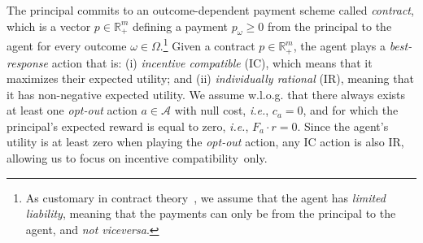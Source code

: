 The principal commits to an outcome-dependent payment scheme called \emph{contract}, which is a vector $p \in \mathbb{R}^{m}_{+}$ defining a payment $p_\omega \geq 0$ from the principal to the agent for every outcome $\omega \in \Omega$.\footnote{As customary in contract theory~\citep{carroll2015robustness}, we assume that the agent has \emph{limited liability}, meaning that the payments can only be from the principal to the agent, and \emph{not viceversa}.}
%
%
Given a contract $p \in \mathbb{R}^{m}_{+}$, the agent plays a \emph{best-response} action that is: {(i)} \emph{incentive compatible} (IC), which means that it maximizes their expected utility; and {(ii)} \emph{individually rational} (IR), meaning that it has non-negative expected utility.
%
We assume w.l.o.g. that there always exists at least one \emph{opt-out} action $a \in \mathcal{A}$ with null cost, \emph{i.e.}, $c_a = 0$, and for which the principal's expected reward is equal to zero, \emph{i.e.}, $ F_{a} \cdot  r = 0$.
%
Since the agent's utility is at least zero when playing the \emph{opt-out} action, any IC action is also IR, allowing us to focus on incentive compatibility~only.

